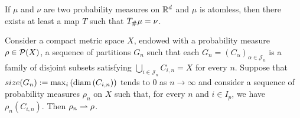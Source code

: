 \begin{theorem}
	If $\mu$ and $\nu$ are two probability measures on $\mathbb{R}^d$ and $\mu$ is atomless, then there exists at least a map $T$ such that ${T}_{\#} \mu=\nu$.
\end{theorem}
			
\begin{theorem}
	Consider a compact metric space $X$, endowed with a probability measure $\rho \in \mathcal{P}(X)$, a sequence of partitions $G_n$ such that each $G_n=(C_\alpha)_{\alpha \in \mathcal{J}_n}$ is a family of disjoint subsets satisfying $\bigcup_{i\in \mathcal{J}_n}C_{i,n}=X$ for every $n$. Suppose that $size(G_n):=\max_i \left( \mathrm{diam}\left( C_{i,n} \right) \right)$ tends to $0$ as $n\rightarrow \infty$ and consider a sequence of probability measures $\rho_n$ on $X$ such that, for every $n$ and $i\in I_p$, we have $\rho_n(C_{i,n})$. Then $\rho_n\rightharpoonup\rho$.
\end{theorem}